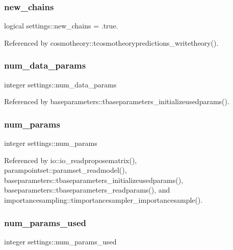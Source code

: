 \subsubsection{\texorpdfstring{new\+\_\+chains}{new\_chains}}
{\footnotesize\ttfamily logical settings\+::new\+\_\+chains = .true.}



Referenced by cosmotheory\+::tcosmotheorypredictions\+\_\+writetheory().

\mbox{\label{namespacesettings_a588b630a77c6cf16ccd63096b5ac4507}} 
\subsubsection{\texorpdfstring{num\+\_\+data\+\_\+params}{num\_data\_params}}
{\footnotesize\ttfamily integer settings\+::num\+\_\+data\+\_\+params}



Referenced by baseparameters\+::tbaseparameters\+\_\+initializeusedparams().

\mbox{\label{namespacesettings_a4faf08502e49a2f851b29d8f7d5fb71d}} 
\subsubsection{\texorpdfstring{num\+\_\+params}{num\_params}}
{\footnotesize\ttfamily integer settings\+::num\+\_\+params}



Referenced by io\+::io\+\_\+readproposematrix(), parampointset\+::paramset\+\_\+readmodel(), baseparameters\+::tbaseparameters\+\_\+initializeusedparams(), baseparameters\+::tbaseparameters\+\_\+readparams(), and importancesampling\+::timportancesampler\+\_\+importancesample().

\mbox{\label{namespacesettings_ace1e5374df8682e0f85b1b7bcc21451c}} 
\subsubsection{\texorpdfstring{num\+\_\+params\+\_\+used}{num\_params\_used}}
{\footnotesize\ttfamily integer settings\+::num\+\_\+params\+\_\+used}



